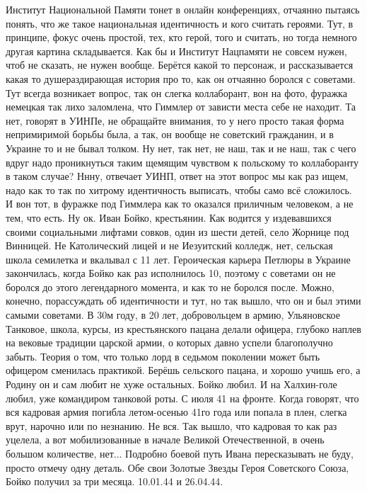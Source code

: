 Институт Национальной Памяти тонет в онлайн конференциях, отчаянно пытаясь понять, что же такое национальная идентичность и кого считать героями.
Тут, в принципе, фокус очень простой, тех, кто герой, того и считать, но тогда немного другая картина складывается.
Как бы и Институт Нацпамяти не совсем нужен, чтоб не сказать, не нужен вообще.
Берётся какой то персонаж, и рассказывается какая то душераздирающая история про то, как он отчаянно боролся с советами.
Тут всегда возникает вопрос, так он слегка коллаборант, вон на фото, фуражка немецкая так лихо заломлена, что Гиммлер от зависти места себе не находит.
Та нет, говорят в УИНПе, не обращайте внимания, то у него просто такая форма непримиримой борьбы была, а так, он вообще не советский гражданин, и в Украине то и не бывал толком.
Ну нет, так нет, не наш, так и не наш, так с чего вдруг надо проникнуться таким щемящим чувством к польскому то коллаборанту в таком случае?
Ннну, отвечает УИНП, ответ на этот вопрос мы как раз ищем, надо как то так по хитрому идентичность выписать, чтобы само всё сложилось.
И вон тот, в фуражке под Гиммлера как то оказался приличным человеком, а не тем, что есть.
Ну ок.
Иван Бойко, крестьянин.
Как водится у издевавшихся своими социальными лифтами совков, один из шести детей, село Жорнице под Винницей.
Не Католический лицей и не Иезуитский колледж, нет, сельская школа семилетка и вкалывал   с 11 лет.
Героическая карьера Петлюры в Украине закончилась, когда Бойко как раз исполнилось 10, поэтому с советами он не боролся до этого легендарного момента, и как то не боролся после.
Можно, конечно, порассуждать об идентичности и тут, но так вышло, что он и был этими самыми советами.
В 30м году, в 20 лет, добровольцем в армию, Ульяновское Танковое, школа, курсы, из крестьянского пацана делали офицера, глубоко наплев на вековые традиции царской армии, о которых давно успели благополучно забыть.
Теория о том, что только лорд в седьмом поколении может быть офицером сменилась практикой.
Берёшь сельского пацана, и хорошо учишь его, а Родину он и сам любит не хуже остальных.
Бойко любил.
И на Халхин-голе любил, уже командиром танковой роты.
С июля 41 на фронте.
Когда говорят, что вся кадровая армия погибла летом-осенью 41го года или попала в плен, слегка врут, нарочно или по незнанию.
Не вся.
Так вышло, что кадровая то как раз уцелела, а вот мобилизованные в начале Великой Отечественной, в очень большом количестве, нет...
Подробно боевой путь Ивана пересказывать не буду, просто отмечу одну деталь.
Обе свои Золотые Звезды Героя Советского Союза, Бойко получил за три  месяца.
10.01.44 и 26.04.44.

